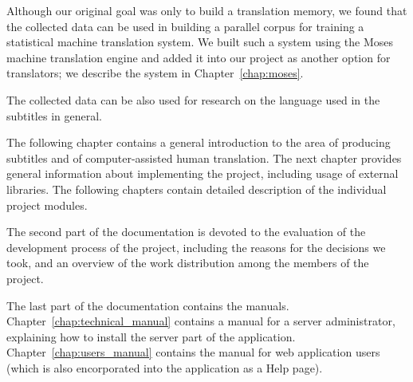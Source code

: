 Although our original goal was only to build a translation memory, we found that the collected data can be used in building a parallel corpus for training a statistical machine translation system. We built such a system using the Moses machine translation engine and added it into our project as another option for translators; we describe the system in Chapter~\ref{chap:moses}.

The collected data can be also used for research on the language used in the subtitles in general.

The following chapter contains a general introduction to the area of producing subtitles and of computer-assisted human translation. The next chapter provides general information about implementing the project, including usage of external libraries. The following chapters contain detailed description of the individual project modules.

The second part of the documentation is devoted to the evaluation of the development process of the project, including the reasons for the decisions we took, and an overview of the work distribution among the members of the project.

The last part of the documentation contains the manuals. Chapter~\ref{chap:technical_manual} contains a manual for a server administrator, explaining how to install the server part of the application. Chapter~\ref{chap:users_manual} contains the manual for web application users (which is also encorporated into the application as a Help page).